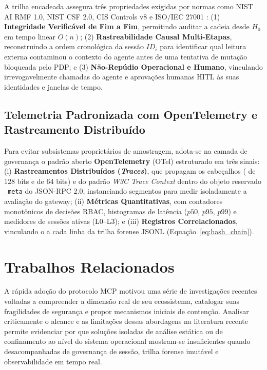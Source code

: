 A trilha encadeada assegura três propriedades exigidas por normas como NIST AI RMF 1.0, NIST CSF 2.0, CIS Controls v8 e ISO/IEC 27001 \cite{jang2026hierarchical}: (1) \textbf{Integridade Verificável de Fim a Fim}, permitindo auditar a cadeia desde $H_0$ em tempo linear $O(n)$; (2) \textbf{Rastreabilidade Causal Multi-Etapas}, reconstruindo a ordem cronológica da sessão $ID_i$ para identificar qual leitura externa contaminou o contexto do agente antes de uma tentativa de mutação bloqueada pelo PDP; e (3) \textbf{Não-Repúdio Operacional e Humano}, vinculando irrevogavelmente chamadas do agente e aprovações humanas HITL às suas identidades e janelas de tempo.

\subsection{Telemetria Padronizada com OpenTelemetry e Rastreamento Distribuído}
\label{subsec:opentelemetry_mcp}

Para evitar subsistemas proprietários de amostragem, adota-se na camada de governança o padrão aberto \textbf{OpenTelemetry} (OTel) estruturado em três sinais: (i) \textbf{Rastreamentos Distribuídos (\textit{Traces})}, que propagam os cabeçalhos  ( de 128 bits e  de 64 bits) e  do padrão \textit{W3C Trace Context} dentro do objeto reservado \texttt{\_meta} do JSON-RPC 2.0, instanciando segmentos para medir isoladamente a avaliação do gateway; (ii) \textbf{Métricas Quantitativas}, com contadores monotônicos de decisões RBAC, histogramas de latência ($p50$, $p95$, $p99$) e medidores de sessões ativas (L0--L3); e (iii) \textbf{Registros Correlacionados}, vinculando o  a cada linha da trilha forense JSONL (Equação~\ref{eq:hash_chain}).

\section{Trabalhos Relacionados}
\label{sec:trabalhos_relacionados}

A rápida adoção do protocolo MCP motivou uma série de investigações recentes voltadas a compreender a dimensão real de seu ecossistema, catalogar suas fragilidades de segurança e propor mecanismos iniciais de contenção. Analisar criticamente o alcance e as limitações dessas abordagens na literatura recente permite evidenciar por que soluções isoladas de análise estática ou de confinamento ao nível do sistema operacional mostram-se insuficientes quando desacompanhadas de governança de sessão, trilha forense imutável e observabilidade em tempo real.

